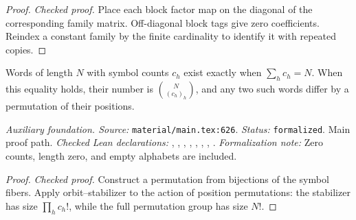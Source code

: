 \begin{proof}
\leanok
{}
\textit{Checked proof.} Place each block factor map on the diagonal of the corresponding family matrix. Off-diagonal block tags give zero coefficients. Reindex a constant family by the finite cardinality to identify it with repeated copies.
\end{proof}

\renewcommand{\thetheorem}{A67}
\begin{lemma}
\label{aux:word-type-cardinality}
\leanok
Words of length $N$ with symbol counts $c_h$ exist exactly when $\sum_h c_h=N$. When this equality holds, their number is $\binom{N}{(c_h)_h}$, and any two such words differ by a permutation of their positions.
\end{lemma}

\noindent\textit{Auxiliary foundation. Source:} \texttt{material/main.tex:626}.
\textit{Status:} \texttt{formalized}. Main proof path.
\textit{Checked Lean declarations:} , , , , , , , .
\textit{Formalization note:} Zero counts, length zero, and empty alphabets are included.

\begin{proof}
\leanok
\textit{Checked proof.} Construct a permutation from bijections of the symbol fibers. Apply orbit--stabilizer to the action of position permutations: the stabilizer has size $\prod_h c_h!$, while the full permutation group has size $N!$.
\end{proof}

